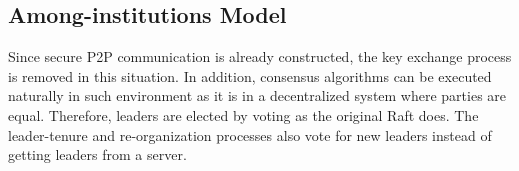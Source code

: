 \subsection{Among-institutions Model}
Since secure P2P communication is already constructed, the key exchange process is removed in this situation. In addition, consensus algorithms can be executed naturally in such environment as it is in a decentralized system where parties are equal. Therefore, leaders are elected by voting as the original Raft does. The leader-tenure and re-organization processes also vote for new leaders instead of getting leaders from a server.

